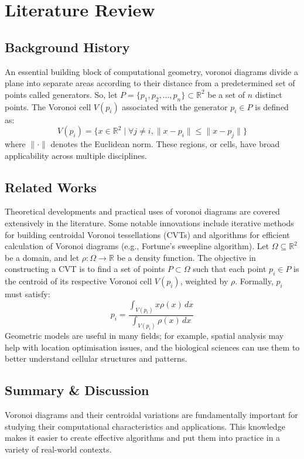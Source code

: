 \documentclass[12pt,a4paper]{report}
\begin{document}
\chapter{Literature Review}

\section{Background History}

An essential building block of computational geometry, voronoi diagrams divide a plane into separate areas according to their distance from a predetermined set of points called generators. So, let \( P = \{p_1, p_2, \ldots, p_n\} \subset \mathbb{R}^2 \) be a set of \( n \) distinct points. The Voronoi cell \( V(p_i) \) associated with the generator \( p_i \in P \) is defined as:
\[
V(p_i) = \{ x \in \mathbb{R}^2 \mid \forall j \neq i, \|x - p_i\| \leq \|x - p_j\| \}
\]
where \( \|\cdot\| \) denotes the Euclidean norm. These regions, or cells, have broad applicability across multiple disciplines.

\section{Related Works}

Theoretical developments and practical uses of voronoi diagrams are covered extensively in the literature. Some notable innovations include iterative methods for building centroidal Voronoi tessellations (CVTs) and algorithms for efficient calculation of Voronoi diagrams (e.g., Fortune's sweepline algorithm). Let \( \Omega \subseteq \mathbb{R}^2 \) be a domain, and let \( \rho: \Omega \to \mathbb{R} \) be a density function. The objective in constructing a CVT is to find a set of points \( P \subset \Omega \) such that each point \( p_i \in P \) is the centroid of its respective Voronoi cell \( V(p_i) \), weighted by \( \rho \). Formally, \( p_i \) must satisfy:
\[
p_i = \frac{\int_{V(p_i)} x \rho(x) \, dx}{\int_{V(p_i)} \rho(x) \, dx}
\]
Geometric models are useful in many fields; for example, spatial analysis may help with location optimisation issues, and the biological sciences can use them to better understand cellular structures and patterns.

\section{Summary \& Discussion}

Voronoi diagrams and their centroidal variations are fundamentally important for studying their computational characteristics and applications. This knowledge makes it easier to create effective algorithms and put them into practice in a variety of real-world contexts.
\end{document}
